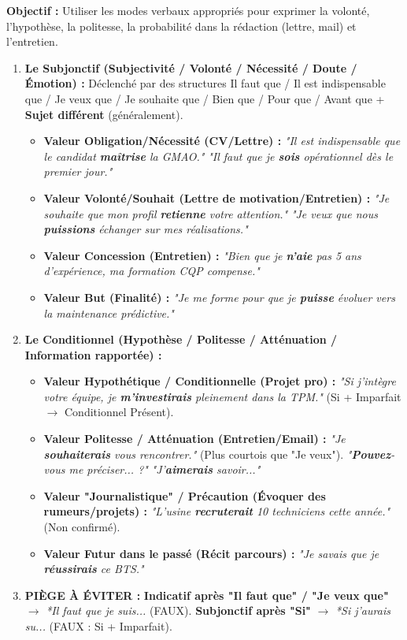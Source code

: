 \documentclass[11pt]{article}
\newcommand{\cle}[1]{{\popxbold\color{popdark}#1}}
\begin{document}
\begin{methode}
\textbf{Objectif :} Utiliser les modes verbaux appropriés pour exprimer la volonté, l'hypothèse, la politesse, la probabilité dans la rédaction (lettre, mail) et l'entretien.
\begin{enumerate}
    \item \textbf{Le Subjonctif (Subjectivité / Volonté / Nécessité / Doute / Émotion) :} Déclenché par des structures \cle{Il faut que / Il est indispensable que / Je veux que / Je souhaite que / Bien que / Pour que / Avant que} + \textbf{Sujet différent} (généralement).
    \begin{itemize}
        \item \textbf{Valeur Obligation/Nécessité (CV/Lettre) :} \emph{"Il est indispensable que le candidat \textbf{maîtrise} la GMAO."} \emph{"Il faut que je \textbf{sois} opérationnel dès le premier jour."}
        \item \textbf{Valeur Volonté/Souhait (Lettre de motivation/Entretien) :} \emph{"Je souhaite que mon profil \textbf{retienne} votre attention."} \emph{"Je veux que nous \textbf{puissions} échanger sur mes réalisations."}
        \item \textbf{Valeur Concession (Entretien) :} \emph{"Bien que je \textbf{n'aie} pas 5 ans d'expérience, ma formation CQP compense."}
        \item \textbf{Valeur But (Finalité) :} \emph{"Je me forme pour que je \textbf{puisse} évoluer vers la maintenance prédictive."}
    \end{itemize}
    \item \textbf{Le Conditionnel (Hypothèse / Politesse / Atténuation / Information rapportée) :}
    \begin{itemize}
        \item \textbf{Valeur Hypothétique / Conditionnelle (Projet pro) :} \emph{"Si j'intègre votre équipe, je \textbf{m'investirais} pleinement dans la TPM."} (Si + Imparfait $\rightarrow$ Conditionnel Présent).
        \item \textbf{Valeur Politesse / Atténuation (Entretien/Email) :} \emph{"Je \textbf{souhaiterais} vous rencontrer."} (Plus courtois que "Je veux"). \emph{"\textbf{Pouvez}-vous me préciser... ?"} \emph{"J'\textbf{aimerais} savoir..."}
        \item \textbf{Valeur "Journalistique" / Précaution (Évoquer des rumeurs/projets) :} \emph{"L'usine \textbf{recruterait} 10 techniciens cette année."} (Non confirmé).
        \item \textbf{Valeur Futur dans le passé (Récit parcours) :} \emph{"Je savais que je \textbf{réussirais} ce BTS."}
    \end{itemize}
    \item \textbf{PIÈGE À ÉVITER :} \textbf{Indicatif après "Il faut que" / "Je veux que"} $\rightarrow$ \emph{*Il faut que je suis...} (FAUX). \textbf{Subjonctif après "Si"} $\rightarrow$ \emph{*Si j'aurais su...} (FAUX : Si + Imparfait).
\end{enumerate}
\end{methode}
\end{document}

